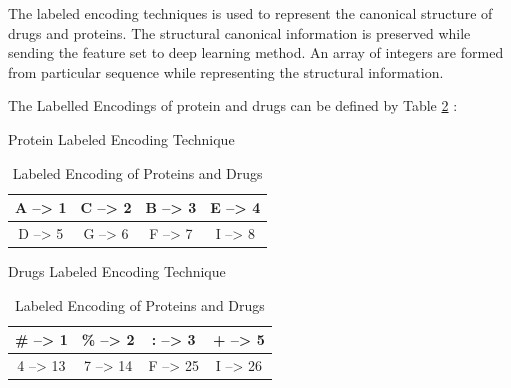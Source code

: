   The labeled encoding techniques is used to represent the canonical structure of drugs and proteins. The structural canonical information is preserved while sending the feature set to deep learning method. An array of integers are formed from particular sequence while representing the structural information.
  
  The Labelled Encodings of protein and drugs can be defined by Table \ref{table:label_encoding} :
  \begin{table}[H]
    \centering
    \begin{subtable}{Protein Labeled Encoding Technique}
      \centering
      \begin{tabular}{|cccc|}
        \hline
        A --> 1 & C --> 2 & B --> 3 & E --> 4 \\ \hline
        D --> 5 & G --> 6 & F --> 7 & I --> 8 \\ \hline
      \end{tabular}
    \end{subtable}  

    \begin{subtable}{Drugs Labeled Encoding Technique}
      \centering
      \begin{tabular}{|cccc|}
        \hline
        \# --> 1 & \% --> 2 & : --> 3 & + --> 5 \\ \hline
        4 --> 13 & 7 --> 14 & F --> 25 & I --> 26 \\ \hline
      \end{tabular}
    \end{subtable}
    \caption{Labeled Encoding of Proteins and Drugs}
    \label{table:label_encoding}
  \end{table}
  

  